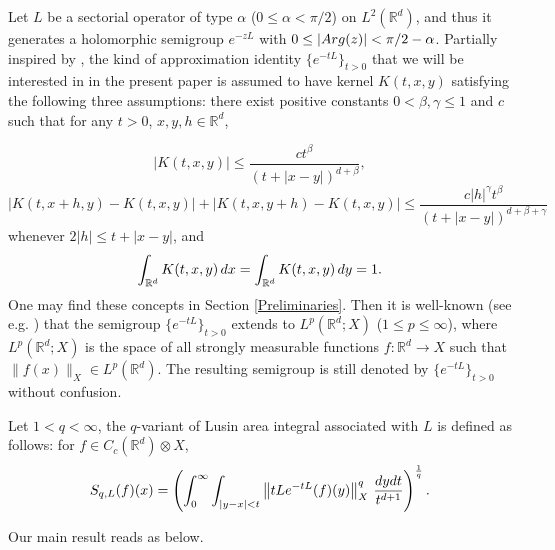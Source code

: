 \documentclass[oneside,english,a4wide]{amsart}
\numberwithin{equation}{section}
\numberwithin{figure}{section}
\theoremstyle{plain}
\theoremstyle{plain}
\theoremstyle{definition}
\theoremstyle{plain}
\theoremstyle{remark}
\theoremstyle{definition}
\theoremstyle{remark}
\theoremstyle{definition}
\newcommand{\real}{{\mathbb R}}
\newcommand{\8}{+\infty}
\renewcommand{\1}{\mathbbm{1}}
\newcommand\norm[1]{ \left\| #1 \right\| }
\newcommand\sk[1]{ \left( #1 \right) }
\renewcommand\d{{\rm d}}
\newcommand\Arg{{\rm Arg}}
\begin{document}
Let $L$ be a sectorial operator of type $\alpha$ ($0 \leq \alpha < \pi/2$) on $L^2(\real^d)$, and thus it generates a holomorphic semigroup  $e^{-zL}  $ with $0\leq|\Arg(z)|<\pi/2-\alpha$. Partially inspired by \cite[Section 6.2.2]{DXT}, the kind of approximation identity $\{e^{-tL}\}_{t>0}$ that we will be interested in in the present paper is assumed to have kernel $K(t, x,y)$ satisfying the following three assumptions:  there exist positive constants $ 0 <\beta, \gamma \leq 1  $ and $c$ such that for any $t>0$, $ x,y,h \in \real^d $,

\begin{equation}\label{pt10}
    |K(t, x, y)| \leq \frac{c t^\beta }{(t + |x - y|)^{d + \beta}},
\end{equation}
\begin{equation}\label{pt2}
  | K(t, x+h, y) - K(t,  x, y) | + | K(t, x, y+h) - K(t, x, y) | \leq \frac{c|h|^\gamma t^\beta}{(t + |x-y|)^{d+\beta+\gamma}}
\end{equation}
whenever $ 2|h| \leq t + |x-y| $, and 
\begin{equation}\label{pt3}
   \int_{\real^d} K(t, x, y) \,\d x = \int_{\real^d} K(t, x, y)\,\d y = 1.
\end{equation}
One may find these concepts in Section \ref{Preliminaries}. Then it is well-known (see e.g. \cite{Xu2021}) that the semigroup $\{e^{-tL}\}_{t>0}$ extends to $L^p(\real^d; X)$ ($1\leq p \leq \infty$), where $L^p(\real^d; X)$ is the space of all strongly measurable functions $f: \real^d \to X$ such that $\|f(x)\|_X \in L^p(\real^d)$. The resulting semigroup is still denoted by $\{e^{-tL}\}_{t>0}$ without confusion. 


Let $1<q<\infty$, the $q$-variant of Lusin area integral %
associated with $L$ is defined as follows: for $f\in C_c(\mathbb R^d)\otimes X$,
\begin{gather*}
    S_{q,L}(f)(x) = \sk{\int_0^{\infty}\int_{|y-x| < t} \norm{tL{e^{-tL}} (f)(y) }_X^q \,\frac{\d y\d t}{t^{d+1}}}^{\frac{1}{q}}.
\end{gather*}

Our main result reads as below.
\end{document}
